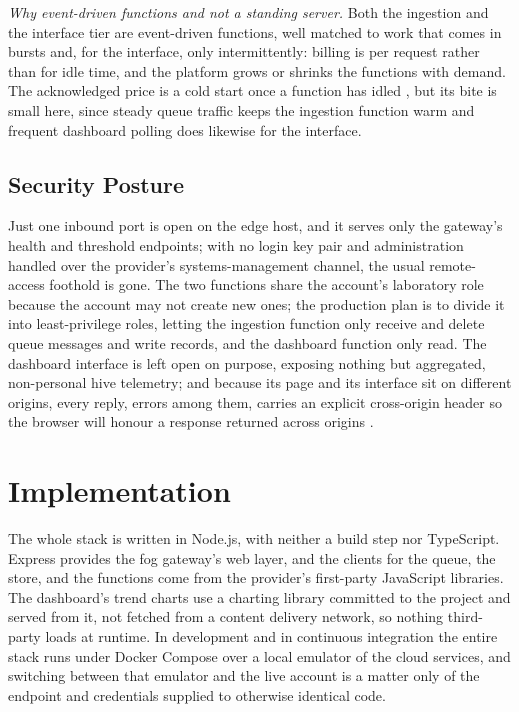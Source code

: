 \documentclass[conference]{IEEEtran}
\begin{document}
\textit{Why event-driven functions and not a standing server.} Both the ingestion and the interface tier are event-driven functions, well matched to work that comes in bursts and, for the interface, only intermittently: billing is per request rather than for idle time, and the platform grows or shrinks the functions with demand. The acknowledged price is a cold start once a function has idled \cite{wang2018}, but its bite is small here, since steady queue traffic keeps the ingestion function warm and frequent dashboard polling does likewise for the interface.

\subsection{Security Posture}

Just one inbound port is open on the edge host, and it serves only the gateway's health and threshold endpoints; with no login key pair and administration handled over the provider's systems-management channel, the usual remote-access foothold is gone. The two functions share the account's laboratory role because the account may not create new ones; the production plan is to divide it into least-privilege roles, letting the ingestion function only receive and delete queue messages and write records, and the dashboard function only read. The dashboard interface is left open on purpose, exposing nothing but aggregated, non-personal hive telemetry; and because its page and its interface sit on different origins, every reply, errors among them, carries an explicit cross-origin header so the browser will honour a response returned across origins \cite{barth2011}.

\section{Implementation}

The whole stack is written in Node.js, with neither a build step nor TypeScript. Express provides the fog gateway's web layer, and the clients for the queue, the store, and the functions come from the provider's first-party JavaScript libraries. The dashboard's trend charts use a charting library committed to the project and served from it, not fetched from a content delivery network, so nothing third-party loads at runtime. In development and in continuous integration the entire stack runs under Docker Compose over a local emulator of the cloud services, and switching between that emulator and the live account is a matter only of the endpoint and credentials supplied to otherwise identical code.
\end{document}
